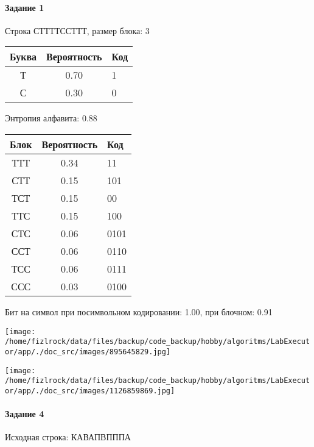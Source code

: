 \documentclass[a4paper, 12pt]{article}
\begin{document}
\paragraph{Задание 1}

Строка СТТТТССТТТ, размер блока: 3
\begin{center}
 \begin{tabular}{ |c|c|l| } 
  \hline
     Буква & Вероятность & Код\\ \hline
Т & 0.70 & 1\\\hline
С & 0.30 & 0
\\ \hline \end{tabular}
\end{center}
Энтропия алфавита: 0.88
\begin{center}
 \begin{tabular}{ |c|c|l| } 
  \hline
     Блок & Вероятность & Код\\ \hline
ТТТ & 0.34 & 11\\\hline
СТТ & 0.15 & 101\\\hline
ТСТ & 0.15 & 00\\\hline
ТТС & 0.15 & 100\\\hline
СТС & 0.06 & 0101\\\hline
ССТ & 0.06 & 0110\\\hline
ТСС & 0.06 & 0111\\\hline
ССС & 0.03 & 0100
\\ \hline \end{tabular}
\end{center}
Бит на символ при посимвольном кодировании: 1.00, при блочном: 0.91

\texttt{[image: /home/fizlrock/data/files/backup/code\_backup/hobby/algoritms/LabExecutor/app/./doc\_src/images/895645829.jpg]}

\texttt{[image: /home/fizlrock/data/files/backup/code\_backup/hobby/algoritms/LabExecutor/app/./doc\_src/images/1126859869.jpg]}
\paragraph{Задание 4}


Исходная строка: КАВАПВПППА
\end{document}
